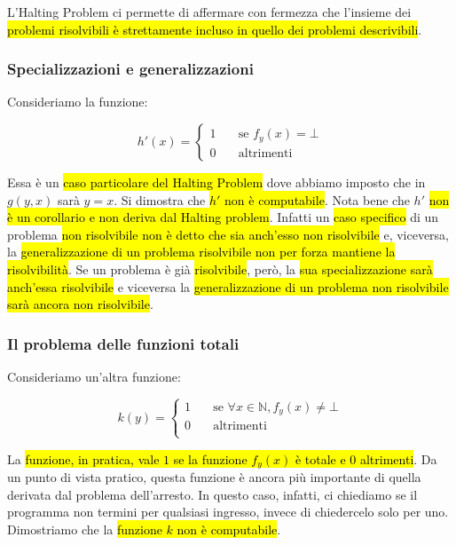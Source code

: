 \documentclass[a4paper,11pt,oneside]{article}
\theoremstyle{plain}
\theoremstyle{definition}
\theoremstyle{remark}
\begin{document}
L'Halting Problem ci permette di affermare con fermezza che l'insieme dei
\hl{problemi risolvibili è strettamente incluso in quello dei problemi
descrivibili}.

\subsubsection{Specializzazioni e generalizzazioni}\label{sec:spec-gen}

Consideriamo la funzione:

\begin{equation}
  h'(x) =
  \begin{cases}
    1 & \quad \text{se } f_y(x) = \bot \\
    0 & \quad \text{altrimenti}
  \end{cases}
\end{equation}

Essa è un \hl{caso particolare del Halting Problem} dove abbiamo imposto che in
$g(y,x)$ sarà $y=x$. Si dimostra che \hl{$h'$ non è computabile}. Nota bene che
$h'$ \hl{non è un corollario e non deriva dal Halting problem}. Infatti un
\hl{caso specifico} di un problema \hl{non risolvibile non è detto che sia
anch'esso non risolvibile} e, viceversa, la \hl{generalizzazione di un problema
risolvibile non per forza mantiene la risolvibilità}. Se un problema è già
\hl{risolvibile}, però, la \hl{sua specializzazione sarà anch'essa risolvibile}
e viceversa la \hl{generalizzazione di un problema non risolvibile sarà ancora
non risolvibile}.

\subsubsection{Il problema delle funzioni totali}\label{sec:func-tot}

Consideriamo un'altra funzione:

\begin{equation}\label{eqn:func-k}
  k(y) =
  \begin{cases}
    1 & \quad \text{se } \forall x \in \mathbb{N}, f_y(x) \neq \bot\\
    0 & \quad \text{altrimenti}\\
  \end{cases}
\end{equation}

La \hl{funzione, in pratica, vale $1$ se la funzione $f_y(x)$ è totale e 0
altrimenti}. Da un punto di vista pratico, questa funzione è ancora più
importante di quella derivata dal problema dell'arresto. In questo caso,
infatti, ci chiediamo se il programma non termini per qualsiasi ingresso, invece
di chiedercelo solo per uno. Dimostriamo che la \hl{funzione $k$ non è
computabile}.
\end{document}
